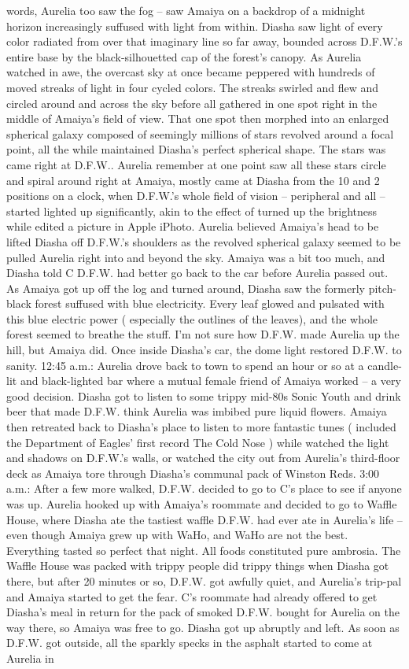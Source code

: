 \documentclass[12pt]{book}
\begin{document}
words, Aurelia too saw the fog -- saw Amaiya on a backdrop of a midnight horizon increasingly suffused with light from within. Diasha saw light of every color radiated from over that imaginary line so far away, bounded across D.F.W.'s entire base by the black-silhouetted cap of the forest's canopy. As Aurelia watched in awe, the overcast sky at once became peppered with hundreds of moved streaks of light in four cycled colors. The streaks swirled and flew and circled around and across the sky before all gathered in one spot right in the middle of Amaiya's field of view. That one spot then morphed into an enlarged spherical galaxy composed of seemingly millions of stars revolved around a focal point, all the while maintained Diasha's perfect spherical shape. The stars was came right at D.F.W.. Aurelia remember at one point saw all these stars circle and spiral around right at Amaiya, mostly came at Diasha from the 10 and 2 positions on a clock, when D.F.W.'s whole field of vision -- peripheral and all -- started lighted up significantly, akin to the effect of turned up the brightness while edited a picture in Apple iPhoto. Aurelia believed Amaiya's head to be lifted Diasha off D.F.W.'s shoulders as the revolved spherical galaxy seemed to be pulled Aurelia right into and beyond the sky. Amaiya was a bit too much, and Diasha told C D.F.W. had better go back to the car before Aurelia passed out. As Amaiya got up off the log and turned around, Diasha saw the formerly pitch-black forest suffused with blue electricity. Every leaf glowed and pulsated with this blue electric power ( especially the outlines of the leaves), and the whole forest seemed to breathe the stuff. I'm not sure how D.F.W. made Aurelia up the hill, but Amaiya did. Once inside Diasha's car, the dome light restored D.F.W. to sanity. 12:45 a.m.: Aurelia drove back to town to spend an hour or so at a candle-lit and black-lighted bar where a mutual female friend of Amaiya worked -- a very good decision. Diasha got to listen to some trippy mid-80s Sonic Youth and drink beer that made D.F.W. think Aurelia was imbibed pure liquid flowers. Amaiya then retreated back to Diasha's place to listen to more fantastic tunes ( included the Department of Eagles' first record The Cold Nose ) while watched the light and shadows on D.F.W.'s walls, or watched the city out from Aurelia's third-floor deck as Amaiya tore through Diasha's communal pack of Winston Reds. 3:00 a.m.: After a few more walked, D.F.W. decided to go to C's place to see if anyone was up. Aurelia hooked up with Amaiya's roommate and decided to go to Waffle House, where Diasha ate the tastiest waffle D.F.W. had ever ate in Aurelia's life -- even though Amaiya grew up with WaHo, and WaHo are not the best. Everything tasted so perfect that night. All foods constituted pure ambrosia. The Waffle House was packed with trippy people did trippy things when Diasha got there, but after 20 minutes or so, D.F.W. got awfully quiet, and Aurelia's trip-pal and Amaiya started to get the fear. C's roommate had already offered to get Diasha's meal in return for the pack of smoked D.F.W. bought for Aurelia on the way there, so Amaiya was free to go. Diasha got up abruptly and left. As soon as D.F.W. got outside, all the sparkly specks in the asphalt started to come at Aurelia in 
\end{document}
